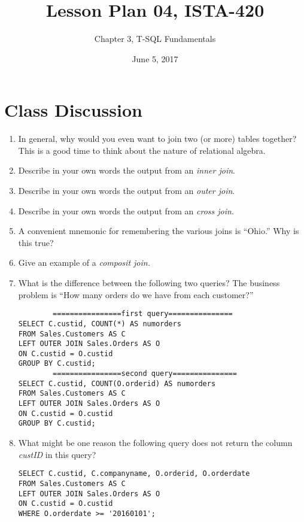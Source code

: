 \documentclass{article}
\title{Lesson Plan 04, ISTA-420}
\author{Chapter 3, T-SQL Fundamentals}
\date{June 5, 2017}
\begin{document}
    

    \maketitle{}

    \section{Class Discussion}

    \begin{enumerate}
        \item In general, why would you even want to join two (or more) tables together? This is a good time to think about the nature of relational algebra.
        \item Describe in your own words the output from an \textit{inner join}.
        \item Describe in your own words the output from an \textit{outer join}.
        \item Describe in your own words the output from an \textit{cross join}.
        \item A convenient mnemonic for remembering the various joins is ``Ohio.'' Why is this true?
        \item Give an example of a \textit{composit join.}
        \item What is the difference between the following two queries? The business problem is ``How many orders do we have from each customer?''

        \begin{verbatim}
        ================first query===============
SELECT C.custid, COUNT(*) AS numorders
FROM Sales.Customers AS C
LEFT OUTER JOIN Sales.Orders AS O
ON C.custid = O.custid
GROUP BY C.custid;
        ================second query===============
SELECT C.custid, COUNT(O.orderid) AS numorders
FROM Sales.Customers AS C
LEFT OUTER JOIN Sales.Orders AS O
ON C.custid = O.custid
GROUP BY C.custid;
        \end{verbatim}
    \item What might be one reason the following query does not return the column \textit{custID} in this query?

        \begin{verbatim}
SELECT C.custid, C.companyname, O.orderid, O.orderdate
FROM Sales.Customers AS C
LEFT OUTER JOIN Sales.Orders AS O
ON C.custid = O.custid
WHERE O.orderdate >= '20160101';
        \end{verbatim}

    \end{enumerate}
\end{document}

